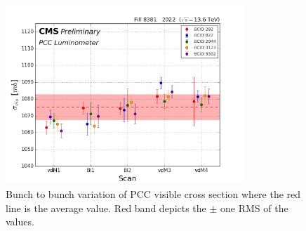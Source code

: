 \begin{itemize}
\begin{figure}[!htp]
\centering
\includegraphics[width=0.8\textwidth]{ashish_thesis/2022_sigma_vis_btob_variation.png}
\caption[$\sigma_{vis}$ Bunch Variation]{%
  Bunch to bunch variation of PCC visible cross section where the red line is the average value. Red band depicts the $\pm$ one RMS of the values.
}
\label{fig:period_bound_99}
\end{figure}



\end{itemize}
